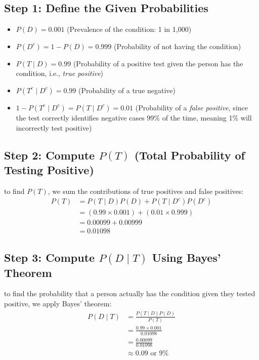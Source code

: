 \documentclass{article}
\begin{document}
\subsection{Step 1: Define the Given Probabilities}
\begin{itemize}
    \item $P(D) = 0.001$ (Prevalence of the condition: 1 in 1,000)
    \item $P(D^c) = 1 - P(D) = 0.999$ (Probability of not having the condition)
    \item $P(T \mid D) = 0.99$ (Probability of a positive test given the person has the condition, i.e., \emph{true positive})
    \item $P(T^c \mid D^c) = 0.99$ (Probability of a true negative)
    \item $1 - P(T^c \mid D^c)  = P(T \mid D^c) = 0.01$ (Probability of a \emph{false positive}, since the test correctly identifies negative cases 99\% of the time, meaning 1\% will incorrectly test positive)
\end{itemize}

\subsection{Step 2: Compute $P(T)$ (Total Probability of Testing Positive)}

to find $P(T)$, we sum the contributions of true positives and false positives:
\begin{align*}
    P(T) &= P(T \mid D) P(D) + P(T \mid D^c) P(D^c) \\
    &= (0.99 \times 0.001) + (0.01 \times 0.999) \\
    &= 0.00099 + 0.00999 \\
    &= 0.01098
\end{align*}

\subsection{Step 3: Compute $P(D \mid T)$ Using Bayes' Theorem}

to find the probability that a person actually has the condition given they tested positive, we apply Bayes' theorem:
\begin{align*}
    P(D \mid T) &= \frac{P(T \mid D) P(D)}{P(T)} \\
    &= \frac{0.99 \times 0.001}{0.01098} \\
    &= \frac{0.00099}{0.01098} \\
    &\approx 0.09 \text{ or } 9\%
\end{align*}
\end{document}
